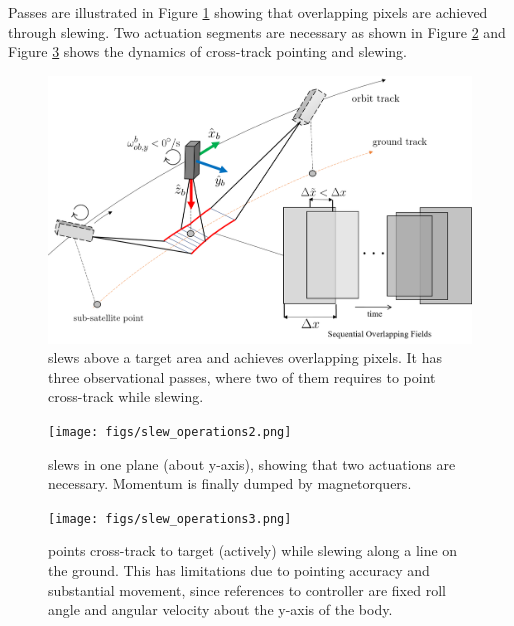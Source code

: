 Passes are illustrated in Figure \ref{fig:slewingops} showing that overlapping pixels are achieved through slewing. Two actuation segments are necessary as shown in Figure \ref{fig:slewingops2} and Figure \ref{fig:slewingops3} shows the dynamics of cross-track pointing and slewing.
\begin{figure}[htbp]
  \centering
    \includegraphics[width=120mm,angle=0]{figs/slew_operations.png}
    \caption{\hypso slews above a target area and achieves overlapping pixels. It has three observational passes, where two of them requires \hypso to point cross-track while slewing.}
    \label{fig:slewingops}
\end{figure}
\begin{figure}[htbp]
  \centering
    \texttt{[image: figs/slew\_operations2.png]}
    \caption{\hypso slews in one plane (about y-axis), showing that two actuations are necessary. Momentum is finally dumped by magnetorquers.}
    \label{fig:slewingops2}
\end{figure}
\begin{figure}[htbp]
  \centering
    \texttt{[image: figs/slew\_operations3.png]}
    \caption{\hypso points cross-track to target (actively) while slewing along a line on the ground. This has limitations due to pointing accuracy and substantial movement, since references to controller are fixed roll angle and angular velocity about the y-axis of the body.}
    \label{fig:slewingops3}
\end{figure}

